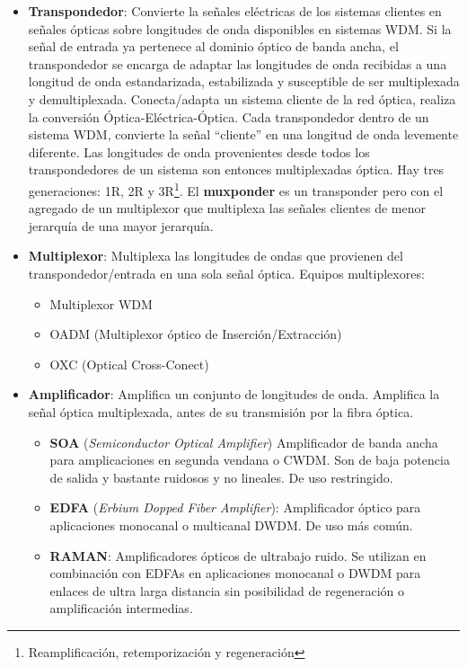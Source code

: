 \documentclass[10pt,portrait, twocolumn]{article}
\begin{document}
	\begin{itemize}
	\item \textbf{Transpondedor}: Convierte la señales eléctricas de los sistemas clientes en señales ópticas sobre longitudes de onda disponibles en sistemas WDM. Si la señal de entrada ya pertenece al dominio óptico de banda ancha, el transpondedor se encarga de adaptar las longitudes de onda recibidas a una longitud de onda estandarizada, estabilizada y susceptible de ser multiplexada y demultiplexada. Conecta/adapta un sistema cliente de la red óptica, realiza la conversión Óptica-Eléctrica-Óptica. Cada transpondedor dentro de un sistema WDM, convierte la señal ``cliente'' en una longitud de onda levemente diferente. Las longitudes de onda provenientes desde todos los transpondedores de un sistema son entonces multiplexadas óptica. Hay tres generaciones: 1R, 2R y 3R\footnote{Reamplificación, retemporización y regeneración}. El \textbf{muxponder} es un transponder pero con el agregado de un multiplexor que multiplexa las señales clientes de menor jerarquía de una mayor jerarquía.
	\item \textbf{Multiplexor}: Multiplexa las longitudes de ondas que provienen del transpondedor/entrada en una sola señal óptica. Equipos multiplexores:
		\begin{itemize}
		\item Multiplexor WDM
		\item OADM (Multiplexor óptico de Inserción/Extracción)
		\item OXC (Optical Cross-Conect)
		\end{itemize}
	\item \textbf{Amplificador}: Amplifica un conjunto de longitudes de onda. Amplifica la señal óptica multiplexada, antes de su transmisión por la fibra óptica.
		\begin{itemize}
		\item \textbf{SOA} (\textit{Semiconductor Optical Amplifier}) Amplificador de banda ancha para amplicaciones en segunda vendana o CWDM. Son de baja potencia de salida y bastante ruidosos y no lineales. De uso restringido.
		\item \textbf{EDFA} (\textit{Erbium Dopped Fiber Amplifier}): Amplificador óptico para aplicaciones monocanal o multicanal DWDM. De uso más común.
		\item \textbf{RAMAN}: Amplificadores ópticos de ultrabajo ruido. Se utilizan en combinación con EDFAs en aplicaciones monocanal o DWDM para enlaces de ultra larga distancia sin posibilidad de regeneración o amplificación intermedias.
		\end{itemize}
	\end{itemize}
	
\end{document}
